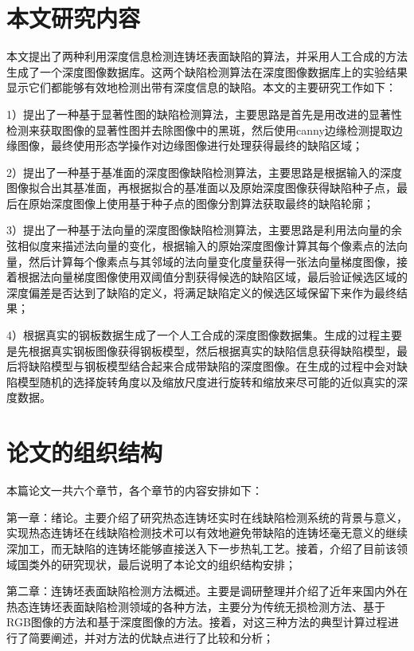     \section{本文研究内容}
    本文提出了两种利用深度信息检测连铸坯表面缺陷的算法，并采用人工合成的方法生成了一个深度图像数据库。这两个缺陷检测算法在深度图像数据库上的实验结果显示它们都能够有效地检测出带有深度信息的缺陷。本文的主要研究工作如下：

    1）提出了一种基于显著性图的缺陷检测算法，主要思路是首先是用改进的显著性检测来获取图像的显著性图并去除图像中的黑斑，然后使用canny边缘检测提取边缘图像，最终使用形态学操作对边缘图像进行处理获得最终的缺陷区域；

    2）提出了一种基于基准面的深度图像缺陷检测算法，主要思路是根据输入的深度图像拟合出其基准面，再根据拟合的基准面以及原始深度图像获得缺陷种子点，最后在原始深度图像上使用基于种子点的图像分割算法获取最终的缺陷轮廓；

    3）提出了一种基于法向量的深度图像缺陷检测算法，主要思路是利用法向量的余弦相似度来描述法向量的变化，根据输入的原始深度图像计算其每个像素点的法向量，然后计算每个像素点与其邻域的法向量变化度量获得一张法向量梯度图像，接着根据法向量梯度图像使用双阈值分割获得候选的缺陷区域，最后验证候选区域的深度偏差是否达到了缺陷的定义，将满足缺陷定义的候选区域保留下来作为最终结果；

    4）根据真实的钢板数据生成了一个人工合成的深度图像数据集。生成的过程主要是先根据真实钢板图像获得钢板模型，然后根据真实的缺陷信息获得缺陷模型，最后将缺陷模型与钢板模型结合起来合成带缺陷的深度图像。在生成的过程中会对缺陷模型随机的选择旋转角度以及缩放尺度进行旋转和缩放来尽可能的近似真实的深度数据。


    \section{论文的组织结构}
    本篇论文一共六个章节，各个章节的内容安排如下：

    第一章：绪论。主要介绍了研究热态连铸坯实时在线缺陷检测系统的背景与意义，实现热态连铸坯在线缺陷检测技术可以有效地避免带缺陷的连铸坯毫无意义的继续深加工，而无缺陷的连铸坯能够直接送入下一步热轧工艺。接着，介绍了目前该领域国类外的研究现状，最后说明了本论文的组织结构安排；

    第二章：连铸坯表面缺陷检测方法概述。主要是调研整理并介绍了近年来国内外在热态连铸坯表面缺陷检测领域的各种方法，主要分为传统无损检测方法、基于RGB图像的方法和基于深度图像的方法。接着，对这三种方法的典型计算过程进行了简要阐述，并对方法的优缺点进行了比较和分析；

